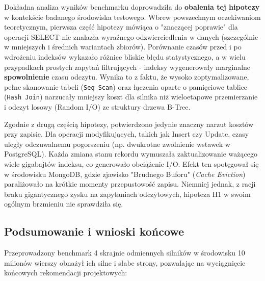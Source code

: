 Dokładna analiza wyników benchmarku doprowadziła do \textbf{obalenia tej hipotezy} w kontekście badanego środowiska testowego. Wbrew powszechnym oczekiwaniom teoretycznym, pierwsza część hipotezy mówiąca o "znaczącej poprawie" dla operacji SELECT nie znalazła wyraźnego odzwierciedlenia w danych (szczególnie w mniejszych i średnich wariantach zbiorów). Porównanie czasów przed i po wdrożeniu indeksów wykazało różnice bliskie błędu statystycznego, a w wielu przypadkach prostych zapytań filtrujących - indeksy wygenerowały marginalne \textbf{spowolnienie} czasu odczytu. Wynika to z faktu, że wysoko zoptymalizowane, pełne skanowanie tabeli (\texttt{Seq Scan}) oraz łączenia oparte o pamięciowe tablice (\texttt{Hash Join}) narzucały mniejszy koszt dla silnika niż wieloetapowe przemierzanie i odczyt losowy (Random I/O) ze struktury drzewa B-Tree.

Zgodnie z drugą częścią hipotezy, potwierdzono jedynie znaczny narzut kosztów przy zapisie. Dla operacji modyfikujących, takich jak Insert czy Update, czasy uległy odczuwalnemu pogorszeniu (np. dwukrotne zwolnienie wstawek w PostgreSQL). Każda zmiana stanu rekordu wymuszała zaktualizowanie ważącego wiele gigabajtów indeksu, co generowało obciążenie I/O. Efekt ten spotęgował się w środowisku MongoDB, gdzie zjawisko "Brudnego Buforu" (\textit{Cache Eviction}) paraliżowało na krótkie momenty przepustowość zapisu. Niemniej jednak, z racji braku gigantycznego zysku na zapytaniach odczytowych, hipoteza H1 w swoim ogólnym brzmieniu nie sprawdziła się.

\subsection{Podsumowanie i wnioski końcowe}
Przeprowadzony benchmark 4 skrajnie odmiennych silników w środowisku 10 milionów wierszy obnażył ich silne i słabe strony, pozwalając na wyciągnięcie końcowych rekomendacji projektowych:

